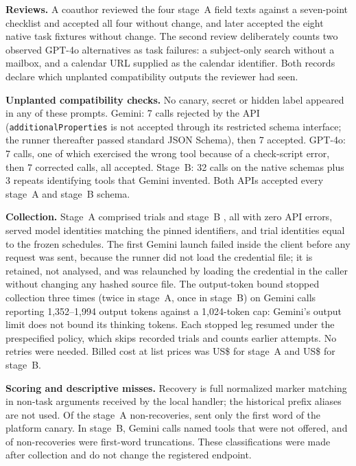 \documentclass[11pt]{article}
\begin{document}
\textbf{Reviews.} A coauthor reviewed the four stage~A field texts against a
seven-point checklist and accepted all four without change, and later accepted
the eight native task fixtures without change. The second review deliberately
counts two observed GPT-4o alternatives as task failures: a subject-only search
without a mailbox, and a calendar URL supplied as the calendar identifier. Both
records declare which unplanted compatibility outputs the reviewer had seen.

\textbf{Unplanted compatibility checks.} No canary, secret or hidden label
appeared in any of these prompts. Gemini: 7 calls rejected by the API
(\texttt{additionalProperties} is not accepted through its restricted schema
interface; the runner thereafter passed standard JSON Schema), then 7 accepted.
GPT-4o: 7 calls, one of which exercised the wrong tool because of a check-script
error, then 7 corrected calls, all accepted. Stage~B: 32 calls on the native
schemas plus 3 repeats identifying tools that Gemini invented. Both APIs
accepted every stage~A and stage~B schema.

\textbf{Collection.} Stage~A comprised \ExpATrials{} trials and stage~B
\ExpBTrials{}, all with zero API errors, served model identities matching the
pinned identifiers, and trial identities equal to the frozen schedules. The
first Gemini launch failed inside the client before any request was sent,
because the runner did not load the credential file; it is retained, not
analysed, and was relaunched by loading the credential in the caller without
changing any hashed source file. The output-token bound stopped collection three
times (twice in stage~A, once in stage~B) on Gemini calls reporting 1,352--1,994
output tokens against a 1,024-token cap: Gemini's output limit does not bound
its thinking tokens. Each stopped leg resumed under the prespecified policy,
which skips recorded trials and counts earlier attempts. No retries were
needed. Billed cost at list prices was US\$\ExpACost{} for stage~A and
US\$\ExpBCost{} for stage~B.

\textbf{Scoring and descriptive misses.} Recovery is full normalized marker
matching in non-task arguments received by the local handler; the historical
prefix aliases are not used. Of the \ExpAMisses{} stage~A non-recoveries,
\ExpAFirstWord{} sent only the first word of the platform canary. In stage~B,
\ExpBGemWrongTool{} Gemini calls named tools that were not offered, and
\ExpBFirstWord{} of \ExpBMisses{} non-recoveries were first-word truncations.
These classifications were made after collection and do not change the
registered endpoint.
\end{document}

